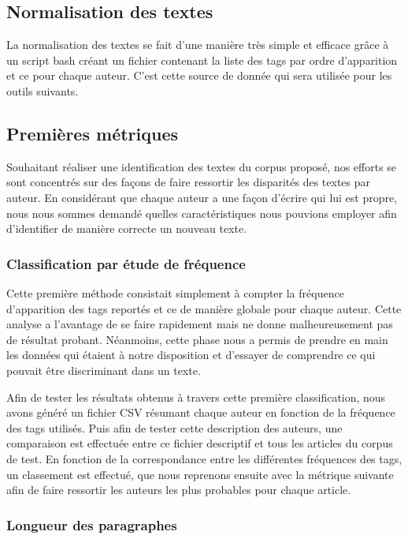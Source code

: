\documentclass[a4paper,12pt]{report}
\begin{document}
\subsection{Normalisation des textes}

La normalisation des textes se fait d'une manière très simple et efficace grâce à un script bash créant un fichier contenant la liste des tags par ordre d'apparition et ce pour chaque auteur. C'est cette source de donnée qui sera utilisée pour les outils suivants. 

\subsection{Premières métriques}

Souhaitant réaliser une identification des textes du corpus proposé, nos efforts se sont concentrés sur des façons de faire ressortir les disparités des textes par auteur. En considérant que chaque auteur a une façon d'écrire qui lui est propre, nous nous sommes demandé quelles caractéristiques nous pouvions employer afin d'identifier de manière correcte un nouveau texte.

\subsubsection{Classification par étude de fréquence}

Cette première méthode consistait simplement à compter la fréquence d'apparition des tags reportés et ce de manière globale pour chaque auteur. Cette analyse a l'avantage de se faire rapidement mais ne donne malheureusement pas de résultat probant. Néanmoins, cette phase nous a permis de prendre en main les données qui étaient à notre disposition et d'essayer de comprendre ce qui pouvait être discriminant dans un texte.

Afin de tester les résultats obtenus à travers cette première classification, nous avons généré un fichier CSV résumant chaque auteur en fonction de la fréquence des tags utilisés. Puis afin de tester cette description des auteurs, une comparaison est effectuée entre ce fichier descriptif et tous les articles du corpus de test. En fonction de la correspondance entre les différentes fréquences des tags, un classement est effectué, que nous reprenons ensuite avec la métrique suivante afin de faire ressortir les auteurs les plus probables pour chaque article.


\subsubsection{Longueur des paragraphes}
\end{document}
